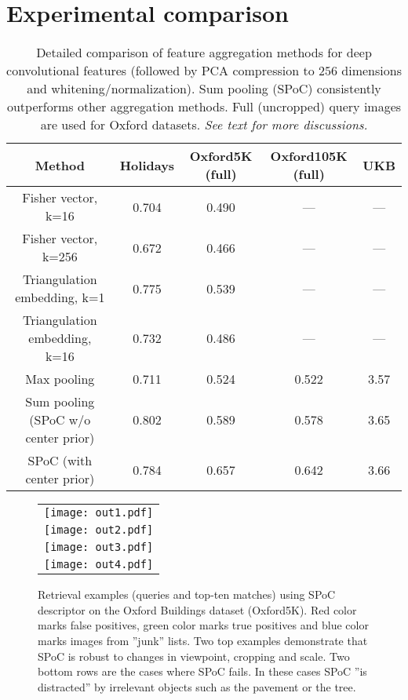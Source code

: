 \section{Experimental comparison}

\begin{table*}
\centering
\begin{tabular}{|c|c|c|c|c|}
\hline
Method & Holidays & Oxford5K (full) & Oxford105K (full) & UKB\\
\hline
Fisher vector, k=16 & 0.704 & 0.490 & --- & ---\\
\hline
Fisher vector, k=256 & 0.672 & 0.466 & --- & ---\\
\hline
Triangulation embedding, k=1 & 0.775 & 0.539 & --- & ---\\
\hline
Triangulation embedding, k=16 & 0.732 & 0.486 & --- & ---\\
\hline
Max pooling  & 0.711 & 0.524 & 0.522 & 3.57\\
\hline
Sum pooling (SPoC w/o center prior) & 0.802 & 0.589 & 0.578 & 3.65\\
SPoC (with center prior) & 0.784 & 0.657 & 0.642 & 3.66\\
\hline
\end{tabular}
\vspace{1mm}

\caption{ Detailed comparison of feature aggregation methods for deep convolutional features (followed by PCA compression to $256$ dimensions and whitening/normalization).
Sum pooling (SPoC) consistently outperforms other aggregation methods. Full (uncropped) query images are used for Oxford datasets.
\textit{See text for more discussions.}}
\label{tab:mainComparison}
\end{table*}

\begin{figure*}
\centering
\begin{tabular}{c}
\texttt{[image: out1.pdf]}\\
\texttt{[image: out2.pdf]}\\
\texttt{[image: out3.pdf]}\\
\texttt{[image: out4.pdf]}
\end{tabular}
\caption{Retrieval examples (queries and top-ten matches) using SPoC descriptor on the Oxford Buildings dataset (Oxford5K). Red color marks false positives, green color marks true positives and blue color marks images from ''junk'' lists. Two top examples demonstrate that SPoC is robust to changes in viewpoint, cropping and scale. Two bottom rows are the cases where SPoC fails. In these cases SPoC ''is distracted'' by irrelevant objects such as the pavement or the tree.}
\label{fig:examples}
\vspace{-3mm}
\end{figure*}

